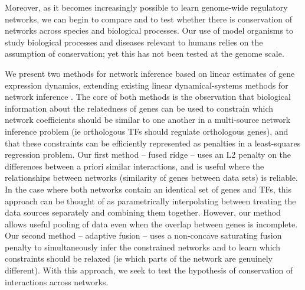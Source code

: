\documentclass[11pt]{article}
\begin{document}
Moreover, as it becomes increasingly possible to learn genome-wide regulatory networks, we can begin to compare and to test whether there is conservation of networks across species and biological processes. Our use of model organisms to study biological processes and diseases relevant to humans relies on the assumption of conservation; yet this has not been tested at the genome scale. 

We present two methods for network inference based on linear estimates of gene expression dynamics, extending existing linear dynamical-systems methods for network inference \cite{bonneau_predictive_2007, arrieta-ortiz_experimentally_2015}. The core of both methods is the observation that biological information about the relatedness of genes can be used to constrain which network coefficients should be similar to one another in a multi-source network inference problem (ie orthologous TFs should regulate orthologous genes), and that these constraints can be efficiently represented as penalties in a least-squares regression problem. Our first method -- fused ridge -- uses an L2 penalty on the differences between a priori similar interactions, and is useful where the relationships between networks (similarity of genes between data sets) is reliable. In the case where both networks contain an identical set of genes and TFs, this approach can be thought of as parametrically interpolating between treating the data sources separately and combining them together. However, our method allows useful pooling of data even when the overlap between genes is incomplete. Our second method -- adaptive fusion -- uses a non-concave saturating fusion penalty to simultaneously infer the constrained networks and to learn which constraints should be relaxed (ie which parts of the network are genuinely different). With this approach, we seek to test the hypothesis of conservation of interactions across networks.
\end{document}
